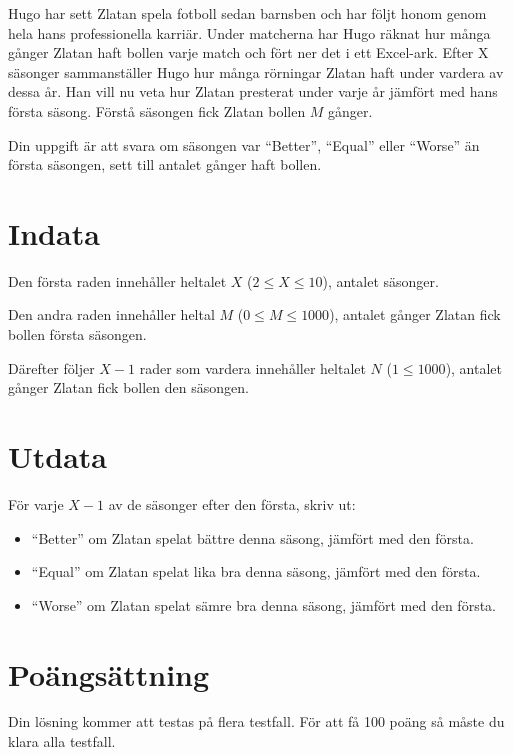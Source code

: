Hugo har sett Zlatan spela fotboll sedan barnsben och har följt honom genom hela hans
professionella karriär. Under matcherna har Hugo räknat hur många gånger Zlatan haft bollen
varje match och fört ner det i ett Excel-ark. Efter X säsonger sammanställer Hugo hur
många rörningar Zlatan haft under vardera av dessa år. Han vill nu veta hur Zlatan presterat
under varje år jämfört med hans första säsong. Förstå säsongen fick Zlatan bollen $M$ gånger.

Din uppgift är att svara om säsongen var ``Better'', ``Equal'' eller ``Worse'' än första säsongen,
sett till antalet gånger haft bollen.

\section*{Indata}
Den första raden innehåller heltalet $X$ ($2 \leq X \leq 10$), antalet säsonger.

Den andra raden innehåller heltal $M$ ($0 \leq M \leq 1000$), antalet gånger Zlatan fick
bollen första säsongen.

Därefter följer $X-1$ rader som vardera innehåller heltalet $N$ ($1 \leq 1000$), antalet
gånger Zlatan fick bollen den säsongen.

\section*{Utdata}
För varje $X-1$ av de säsonger efter den första, skriv ut:
\begin{itemize}
    \item ``Better'' om Zlatan spelat bättre denna säsong, jämfört med den första.
    \item ``Equal'' om Zlatan spelat lika bra denna säsong, jämfört med den första.
    \item ``Worse'' om Zlatan spelat sämre bra denna säsong, jämfört med den första.
\end{itemize}

\section*{Poängsättning}
Din lösning kommer att testas på flera testfall. För att få 100 poäng så måste du klara alla testfall.
